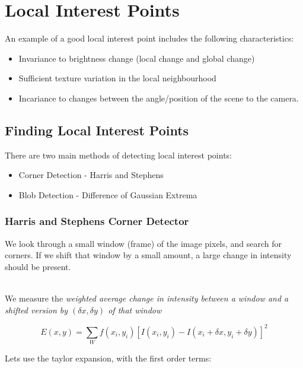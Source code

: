 \section{Local Interest Points}

An example of a good local interest point includes the following characteristics:

\begin{itemize}
    \itemsep0em
    \item Invariance to brightness change (local change and global change)
    \item Sufficient texture variation in the local neighbourhood
    \item Incariance to changes between the angle/position of the scene to the camera.
\end{itemize}

\subsection{Finding Local Interest Points}

There are two main methods of detecting local interest points:

\begin{itemize}
    \itemsep0em
    \item Corner Detection - Harris and Stephens
    \item Blob Detection - Difference of Gaussian Extrema
\end{itemize}

\subsubsection{Harris and Stephens Corner Detector}
We look through a small window (frame) of the image pixels, and search for corners. If we shift that window by a small amount, a large change in intensity should be present.

\\

\noindent We measure the \textit{weighted average change in intensity between a window and a shifted version by $(\delta x, \delta y)$ of that window}

\begin{equation}
    E(x,y) = \sum_{W} f(x_{i},y_{i}) [ I(x_{i},y_{i}) - I(x_{i} + \delta x,y_{i} + \delta y) ]^2
\end{equation}

\noindent Lets use the taylor expansion, with the first order terms:

